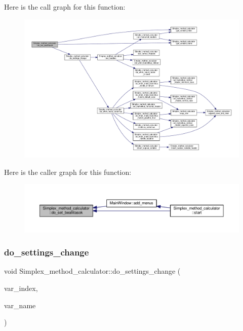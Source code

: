 Here is the call graph for this function\+:\nopagebreak
\begin{figure}[H]
\begin{center}
\leavevmode
\includegraphics[width=350pt]{classSimplex__method__calculator_a1a29425a6f5d789cfd1f2f752e017a17_cgraph}
\end{center}
\end{figure}
Here is the caller graph for this function\+:\nopagebreak
\begin{figure}[H]
\begin{center}
\leavevmode
\includegraphics[width=350pt]{classSimplex__method__calculator_a1a29425a6f5d789cfd1f2f752e017a17_icgraph}
\end{center}
\end{figure}
\mbox{\label{classSimplex__method__calculator_a3f71df14afb7d06f4ed6c1d403d44fcd}} 
\subsubsection{\texorpdfstring{do\+\_\+settings\+\_\+change}{do\_settings\_change}}
{\footnotesize\ttfamily void Simplex\+\_\+method\+\_\+calculator\+::do\+\_\+settings\+\_\+change (\begin{DoxyParamCaption}\item[{int}]{var\+\_\+index,  }\item[{Q\+String}]{var\+\_\+name }\end{DoxyParamCaption})\hspace{0.3cm}{\ttfamily [slot]}}



